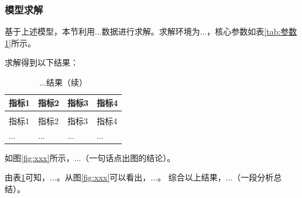 
\subsubsection{模型求解}

基于上述模型，本节利用...数据进行求解。求解环境为...，核心参数如表\ref{tab:参数1}所示。

求解得到以下结果：

\begin{longtable}{>{\centering\arraybackslash}p{}>{\centering\arraybackslash}p{}>{\centering\arraybackslash}p{}>{\centering\arraybackslash}p{}}
  \caption{...结果}
  \label{tab:结果1} \\
  \toprule
  指标1 & 指标2 & 指标3 & 指标4 \\
  \midrule
  \endfirsthead
  \caption{...结果（续）} \\
  \toprule
  指标1 & 指标2 & 指标3 & 指标4 \\
  \midrule
  \endhead
  \bottomrule
  \endfoot
  ... & ... & ... & ... \\
\end{longtable}

如图\ref{fig:xxx}所示，...（一句话点出图的结论）。


由表\ref{tab:结果1}可知，...。从图\ref{fig:xxx}可以看出，...。
综合以上结果，...（一段分析总结）。
